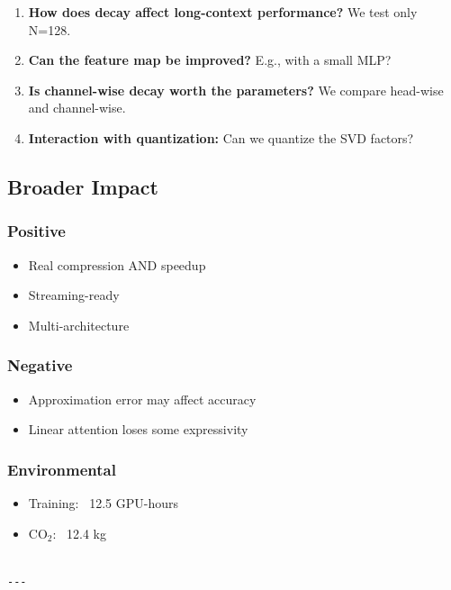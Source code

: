 \begin{enumerate}
\item \textbf{How does decay affect long-context performance?} We test only N=128.
\item \textbf{Can the feature map be improved?} E.g., with a small MLP?
\item \textbf{Is channel-wise decay worth the parameters?} We compare head-wise
  and channel-wise.
\item \textbf{Interaction with quantization:} Can we quantize the SVD factors?

\end{enumerate}
\subsection{Broader Impact}

\subsubsection{Positive}
\begin{itemize}
\item Real compression AND speedup
\item Streaming-ready
\item Multi-architecture

\end{itemize}
\subsubsection{Negative}
\begin{itemize}
\item Approximation error may affect accuracy
\item Linear attention loses some expressivity

\end{itemize}
\subsubsection{Environmental}
\begin{itemize}
\item Training: ~12.5 GPU-hours
\item CO$_2$: ~12.4 kg
\end{itemize}
\begin{lstlisting}

---
\end{lstlisting}